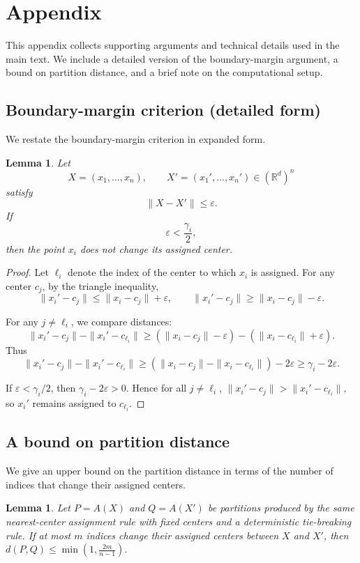 \documentclass[11pt]{amsart}
\theoremstyle{plain}
\newtheorem{lemma}[subsection]{Lemma}
\theoremstyle{definition}
\begin{document}
\appendix
\section{Appendix}

This appendix collects supporting arguments and technical details used in the main text. We include a detailed version of the boundary-margin argument, a bound on partition distance, and a brief note on the computational setup.

\subsection{Boundary-margin criterion (detailed form)}

We restate the boundary-margin criterion in expanded form.

\begin{lemma}
Let
\[
X = (x_1,\ldots,x_n), \qquad X' = (x_1',\ldots,x_n') \in (\mathbb{R}^d)^n
\]
satisfy
\[
\|X - X'\| \le \varepsilon.
\]
If
\[
\varepsilon < \frac{\gamma_i}{2},
\]
then the point $x_i$ does not change its assigned center.
\end{lemma}

\begin{proof}
Let $\ell_i$ denote the index of the center to which $x_i$ is assigned. For any center $c_j$, by the triangle inequality,
\[
\|x_i' - c_j\| \le \|x_i - c_j\| + \varepsilon, \qquad
\|x_i' - c_j\| \ge \|x_i - c_j\| - \varepsilon.
\]

For any $j \ne \ell_i$, we compare distances:
\[
\|x_i' - c_j\| - \|x_i' - c_{\ell_i}\|
\ge (\|x_i - c_j\| - \varepsilon) - (\|x_i - c_{\ell_i}\| + \varepsilon).
\]
Thus
\[
\|x_i' - c_j\| - \|x_i' - c_{\ell_i}\|
\ge (\|x_i - c_j\| - \|x_i - c_{\ell_i}\|) - 2\varepsilon
\ge \gamma_i - 2\varepsilon.
\]

If $\varepsilon < \gamma_i/2$, then $\gamma_i - 2\varepsilon > 0$. Hence for all $j \ne \ell_i$,
$\|x_i' - c_j\| > \|x_i' - c_{\ell_i}\|,$
so $x_i'$ remains assigned to $c_{\ell_i}$.
\end{proof}

\subsection{A bound on partition distance}

We give an upper bound on the partition distance in terms of the number of indices that change their assigned centers.

\begin{lemma}
Let $P = A(X)$ and $Q = A(X')$ be partitions produced by the same nearest-center assignment rule with fixed centers and a deterministic tie-breaking rule. If at most $m$ indices change their assigned centers between $X$ and $X'$, then
$d(P,Q) \le \min\!\left(1, \frac{2m}{n-1}\right).$

\end{lemma}
\end{document}
